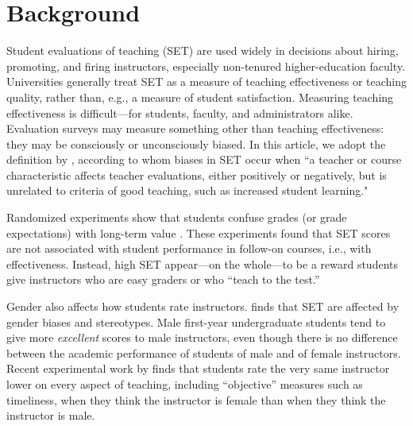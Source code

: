 \documentclass[12pt]{article}
\begin{document}
\begin{quotation}
\begin{abstract}
%

\end{abstract}

\newpage

\end{quotation}

\section{Background}
Student evaluations of teaching (SET) are used widely 
in decisions about hiring, promoting, and firing instructors, especially non-tenured 
higher-education faculty. 
Universities generally treat SET as a measure of teaching effectiveness or teaching quality, 
rather than, e.g., a measure of student satisfaction.
Measuring teaching effectiveness is difficult---for students,
faculty, and administrators alike.
Evaluation surveys may measure something other than teaching effectiveness:
they may be consciously or unconsciously biased. 
In this article, we adopt the definition by \citet[p.17]{Centra2000}, according to whom 
biases in SET occur when ``a teacher
or course characteristic affects teacher evaluations, either positively or
negatively, but is unrelated to criteria of good teaching, such as increased student learning." 

Randomized experiments show that students confuse grades 
(or grade expectations) with long-term value \citep{Carrell2010a,Braga2014}. 
These experiments found that SET scores are not associated with 
student performance in follow-on courses, i.e., with effectiveness. 
Instead, high SET appear---on the whole---to be a reward students give 
instructors who are easy graders or who ``teach to the test.''  

Gender also affects how students rate instructors.
\citet{Boring2015} finds that SET are affected by gender biases and stereotypes. 
Male first-year undergraduate students tend to give more \textit{excellent} scores to male instructors,
even though there is no difference between
the academic performance of students of male and of female instructors.
Recent experimental work by \citet{MacNell2014} finds that
students rate the very same instructor lower on every aspect of teaching,
including ``objective'' measures such as timeliness, when they think the instructor is 
female than when they think the instructor is male. 
\end{document}
